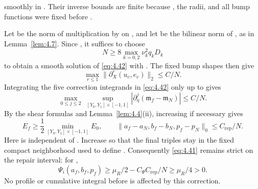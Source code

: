 %
smoothly in . Their inverse bounds are finite because
, the radii, and all bump functions were fixed before
.

Let  be the norm of multiplication by
 on
, and let  be the
bilinear norm of
, as in Lemma~\ref{lem:4.7}.
Since , it suffices to
choose
\[
N\ge 8\max_{k=0,2}\nu_k^2q_kD_k
\]
to obtain a smooth solution of \eqref{eq:4.42} with
. The fixed bump
shapes then give
\[
\max_{r\le 1}\lVert \partial_X^r(u_c,e_c)\rVert_2\le C/N.
\]
Integrating the five correction integrands in \eqref{eq:4.42} only up to
 gives
\[
\max_{0\le j\le 2}\ \sup_{[Y_0,Y_1]\times[-1,1]}
\left|\partial_\eta^j(\mathfrak m_f-\mathfrak m_N)\right|\le C/N.
\]
By the shear formulas and Lemma~\ref{lem:4.4}\textup{(ii)}, increasing
 if necessary gives
\[
E_f\ge \frac12\min_{[Y_0,Y_1]\times[-1,1]}E_0,
\qquad
\lVert a_f-a_N,b_f-b_N,p_f-p_N\rVert_0
\le C_{\mathrm{rep}}/N.
\]
Here  is independent of
. Increase  so that the final
triples stay in the fixed compact neighborhood used to define
. Consequently \eqref{eq:4.41} remains strict on
the repair interval: for
,
\[
\Psi_i(a_f,b_f,p_f)\ge \mu_R/2-C_\Psi C_{\mathrm{rep}}/N
\ge \mu_R/4>0.
\]
No profile or cumulative integral before  is affected
by this correction.


